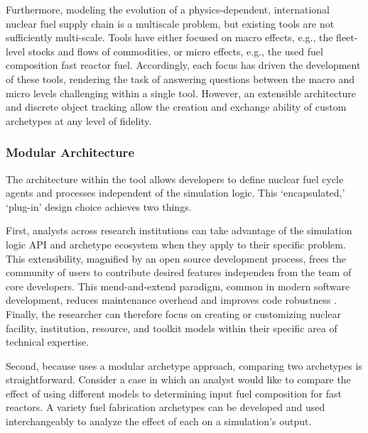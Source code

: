 Furthermore, modeling the evolution of a physics-dependent, international nuclear fuel supply
chain is a multiscale problem, but existing tools are not sufficiently 
multi-scale. Tools have either focused on macro effects, e.g., the fleet-level
stocks and flows of commodities, or micro effects, e.g., the used fuel
composition fast reactor fuel. Accordingly, each focus has driven the
development of these tools, rendering the task of answering questions between
the macro and micro levels challenging within a single tool. 
However, an extensible architecture and discrete object tracking allow 
the creation and exchange ability of custom \Cyclus archetypes at any level of fidelity.

\subsubsection{Modular Architecture}

The architecture within the \Cyclus tool allows developers 
to define nuclear fuel cycle agents and processes independent of the simulation 
logic. This `encapsulated,' `plug-in'
design choice achieves two things. 

First, analysts across research institutions can take advantage of the 
simulation logic \gls{API} and archetype ecosystem when they apply \Cyclus to 
their specific problem. This extensibility, magnified by an open source 
development process, frees the community of users to contribute desired 
features independen from the team of \Cyclus core developers. This 
mend-and-extend paradigm, common in modern software development, reduces 
maintenance overhead and improves code robustness \cite{citation_needed}. 
Finally, the researcher can therefore focus on creating or customizing nuclear 
facility, institution, resource, and toolkit models within their specific area 
of technical expertise. 

Second, because \Cyclus uses a modular archetype approach, comparing two 
archetypes is straightforward. Consider a case in which an analyst would like 
to compare the effect of using different models to determining input fuel 
composition for fast reactors. A variety fuel fabrication archetypes can be 
developed and used interchangeably to analyze the effect of each on a 
simulation's output.

